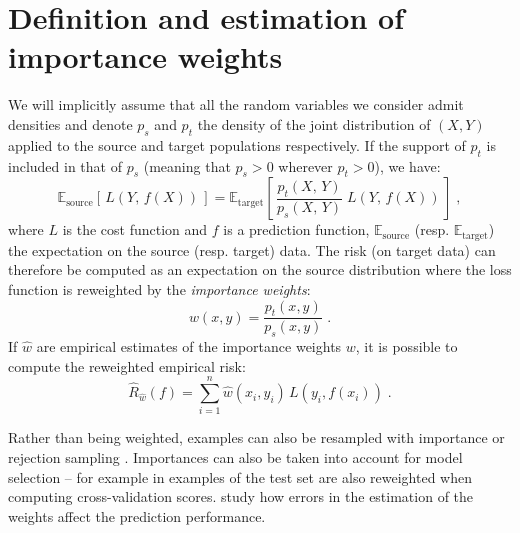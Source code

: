 \documentclass[twocolumn]{article}
\newcommand{\E}{ \mathbb{E} }
\begin{document}
\section{Definition and estimation of importance weights}
\label{sec:definition-estimation-iw}
%
We will implicitly assume that all the random variables we consider admit
densities and denote \(p_s\) and \(p_t\) the density of the joint distribution of \((X, Y)\) applied
to the source and target populations respectively.
%
If the support of \(p_t\) is included in that of \(p_s\) (meaning that \(p_s > 0
\) wherever \( p_t > 0\)), we have:
%
\begin{equation}
\E_{\text{source}}[\,L(Y,\,f(X))\,] = \E_{\text{target}}\left[\,\frac{p_t(X,\,Y)}{p_s(X,\,Y)}\;L(Y,\,f(X))\,\right] \; ,
\end{equation}
%
where \(L\) is the cost function and \(f\) is a prediction function, \(\E_{\text{source}}\) (resp. \(\E_{\text{target}}\)) the expectation on the source (resp. target) data.
%
The risk (on target data) can therefore be computed as an expectation on the
source distribution where the loss function is reweighted by the
\emph{importance weights}:
%
\begin{equation}\label{eq:importance-weight-definition}
w(x,y) = \frac{p_t(x,y)}{p_s(x,y)} \; .
\end{equation}
%
If \(\hat{w}\) are empirical estimates  of the importance weights \(w\), it is possible to compute the reweighted empirical risk:
%
\begin{equation}
\hat{R}_{\hat{w}}(f) = \sum_{i=1}^n \hat{w}(x_i, y_i)\,L(y_i, f(x_i)) \; .
\end{equation}
%
%
%

Rather than being weighted, examples can also be resampled with importance or rejection
sampling \citep{zadrozny2003cost,zadrozny2004learning}. Importances can also be
taken into account for model selection -- for example in
\citet{sugiyama2007covariate} examples of the test set are also reweighted when
computing cross-validation scores.
%
 study how errors in the estimation of the weights
affect the prediction performance.
\end{document}
